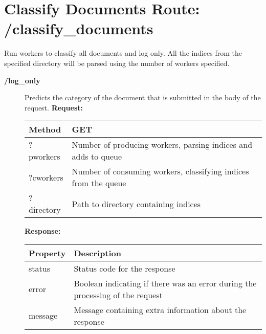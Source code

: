 \section{Classify Documents Route: /classify\_documents}
Run workers to classify all documents and log only.
All the indices from the specified directory will be parsed using the number of workers specified.

\begin{description}

\item[{\large \textbf{/log\_only}}]
Predicts the category of the document that is submitted in the body of the request.
\newline
\newline
\textbf{Request:}
\newline
\newline
\begin{tabular}{ | l | l |}
\hline
Method & GET\\ \hline
?pworkers & Number of producing workers, parsing indices and adds to queue\\ \hline
?cworkers & Number of consuming workers, classifying indices from the queue\\ \hline
?directory & Path to directory containing indices\\ \hline
\end{tabular}
\newline
\newline
\textbf{Response:}
\newline
\newline
\begin{tabular}{ | l | l |}
\hline
\textbf{Property} & \textbf{Description}\\ \hline
status & Status code for the response\\ \hline
error & Boolean indicating if there was an error during the processing of the request\\ \hline
message & Message containing extra information about the response\\ \hline
\end{tabular}\\


\end{description}
